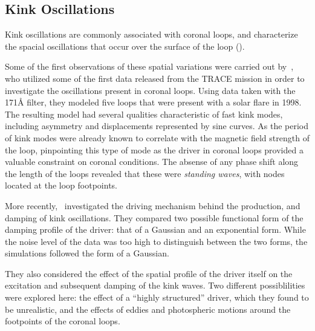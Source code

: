 \documentclass[preprint2]{aastex}
\begin{document}
\subsection{Kink Oscillations}
Kink oscillations are commonly associated with coronal loops, and
characterize the spacial oscillations that occur over the surface of
the loop (\cite{Nak}).



Some of the first observations of these spatial variations
were carried out by~\cite{kink_1},
who utilized some of the first data released from the TRACE mission in
order to investigate the oscillations present in coronal loops.
Using data taken with the 171\AA{} filter, they modeled five loops that
were present with a solar flare in 1998.
The resulting model had several qualities characteristic of
fast kink modes, including asymmetry
and
displacements represented by sine curves.
As the period of kink modes were already known to correlate
with the magnetic field strength of the loop, pinpointing this
type of mode as the driver in coronal loops provided a valuable
constraint on coronal conditions.
The absense of any phase
shift along the length of the loops revealed that these were
\emph{standing waves}, with nodes located at the loop footpoints.

More recently,~\cite{kink_2} investigated the driving mechanism
behind the production, and damping of kink oscillations.
They compared two possible functional form of the damping profile
of the driver: that of a Gaussian and an exponential form.
While the noise level of the data was too high to distinguish
between the two forms, the simulations followed the form of a
Gaussian.

They also considered the effect of the spatial profile of the driver
itself on the excitation and subsequent damping of the kink
waves. Two different possiblilities were explored here:
the effect of a ``highly structured'' driver, which they
found to be unrealistic, and the effects of eddies and photospheric
motions around the footpoints of the coronal loops.
\end{document}
